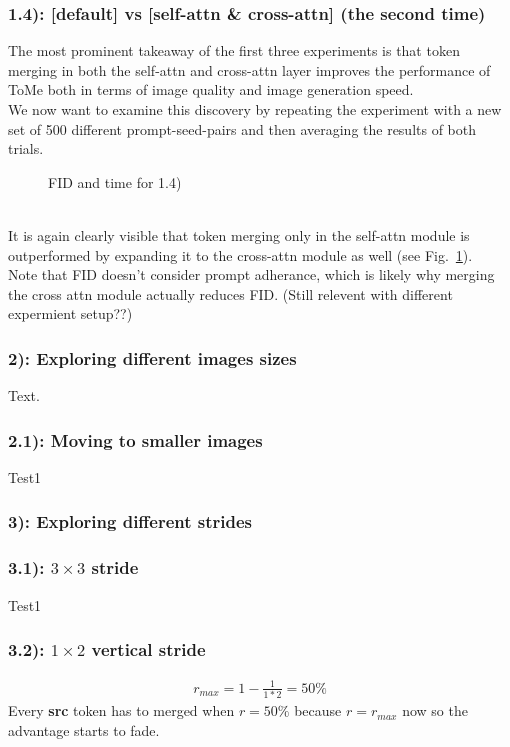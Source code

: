 \newpage
\subsubsection*{1.4): [default] vs [self-attn \& cross-attn] (the second time)}
The most prominent takeaway of the first three experiments is that token merging in both the self-attn and cross-attn layer improves the performance of ToMe both in terms of image quality and image generation speed.\\
We now want to examine this discovery by repeating the experiment with a new set of 500 different prompt-seed-pairs and then averaging the results of both trials.
\begin{figure}[!htb]
    
    
\caption{FID and time for 1.4)}
\label{fig:exp_1_4}
\end{figure}\\
It is again clearly visible that token merging only in the self-attn module is outperformed by expanding it to the cross-attn module as well (see Fig.~\ref{fig:exp_1_4}).
\\
Note that FID doesn’t consider prompt adherance, which is likely why merging the cross attn module actually reduces FID. (Still relevent with different expermient setup??)



\newpage
\subsubsection*{2): Exploring different images sizes}
Text.
\subsubsection*{2.1): Moving to smaller images}
Test1
\begin{figure}[!htb]
    
    
\end{figure}



\newpage
\subsubsection*{3): Exploring different strides}
\subsubsection*{3.1): $3 \times 3$ stride}
Test1
\subsubsection*{3.2): $1 \times 2$ vertical stride}
\begin{align*}
    r_{max} = 1-\frac{1}{1*2} = 50\%
\end{align*}
Every  \textbf{src} token has to merged when \(r=50\%\) because \(r=r_{max}\) now so the advantage starts to fade.

